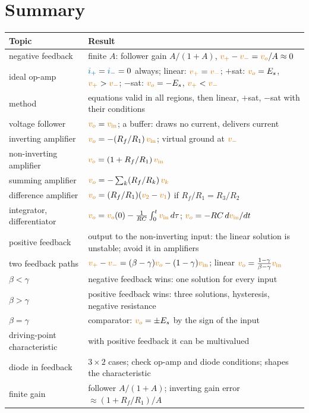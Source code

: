 \documentclass[11pt,a4paper]{article}
\newcommand{\Icol}[1]{\textcolor{ccur}{#1}}
\newcommand{\Vcol}[1]{\textcolor{cvolt}{#1}}
\newcommand{\vin}{\Vcol{v_{\mathrm{in}}}}
\newcommand{\vo}{\Vcol{v_o}}
\newcommand{\vp}{\Vcol{v_+}}
\newcommand{\vm}{\Vcol{v_-}}
\newcommand{\ip}{\Icol{i_+}}
\newcommand{\im}{\Icol{i_-}}
\newcommand{\Es}{E_s}
\begin{document}
\section*{Summary}

\begin{center}
\small
\renewcommand{\arraystretch}{1.35}
\begin{tabular}{@{}>{\raggedright}p{3.6cm} >{\raggedright\arraybackslash}p{10.3cm}@{}}
\toprule
\textbf{Topic} & \textbf{Result}\\
\midrule
negative feedback & finite $A$: follower gain $A/(1+A)$, $\vp - \vm = \vo/A \approx 0$\\
ideal op-amp & $\ip = \im = 0$ always; linear: $\vp = \vm$; $+$sat: $\vo = \Es$, $\vp > \vm$; $-$sat: $\vo = -\Es$, $\vp < \vm$\\
method & equations valid in all regions, then linear, $+$sat, $-$sat with their conditions\\
voltage follower & $\vo = \vin$; a buffer: draws no current, delivers current\\
inverting amplifier & $\vo = -(R_f/R_1)\,\vin$; virtual ground at $\vm$\\
non-inverting amplifier & $\vo = (1 + R_f/R_1)\,\vin$\\
summing amplifier & $\vo = -\sum_k (R_f/R_k)\,\Vcol{v_k}$\\
difference amplifier & $\vo = (R_f/R_1)(\Vcol{v_2} - \Vcol{v_1})$ if $R_f/R_1 = R_3/R_2$\\
integrator, differentiator & $\vo = \vo(0) - \frac{1}{RC}\int_0^t \vin\,d\tau$; \quad $\vo = -RC\,d\vin/dt$\\
positive feedback & output to the non-inverting input: the linear solution is unstable; avoid it in amplifiers\\
two feedback paths & $\vp - \vm = (\beta - \gamma)\vo - (1 - \gamma)\vin$; linear
  $\vo = \frac{1 - \gamma}{\beta - \gamma}\vin$\\
$\beta < \gamma$ & negative feedback wins: one solution for every input\\
$\beta > \gamma$ & positive feedback wins: three solutions, hysteresis, negative resistance\\
$\beta = \gamma$ & comparator: $\vo = \pm\Es$ by the sign of the input\\
driving-point characteristic & with positive feedback it can be multivalued\\
diode in feedback & $3 \times 2$ cases; check op-amp and diode conditions; shapes the characteristic\\
finite gain & follower $A/(1 + A)$; inverting gain error $\approx (1 + R_f/R_1)/A$\\
\bottomrule
\end{tabular}
\end{center}
\end{document}
